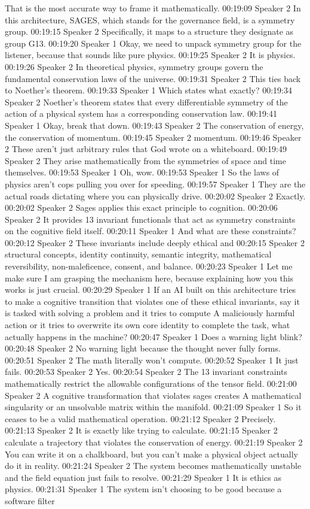 That is the most accurate way to frame it mathematically. 00:19:09 Speaker 2 In this architecture, SAGES, which stands for the governance field, is a symmetry group. 00:19:15 Speaker 2 Specifically, it maps to a structure they designate as group G13. 00:19:20 Speaker 1 Okay, we need to unpack symmetry group for the listener, because that sounds like pure physics. 00:19:25 Speaker 2 It is physics. 00:19:26 Speaker 2 In theoretical physics, symmetry groups govern the fundamental conservation laws of the universe. 00:19:31 Speaker 2 This ties back to Noether's theorem. 00:19:33 Speaker 1 Which states what exactly? 00:19:34 Speaker 2 Noether's theorem states that every differentiable symmetry of the action of a physical system has a corresponding conservation law. 00:19:41 Speaker 1 Okay, break that down. 00:19:43 Speaker 2 The conservation of energy, the conservation of momentum. 00:19:45 Speaker 2 momentum. 00:19:46 Speaker 2 These aren't just arbitrary rules that God wrote on a whiteboard. 00:19:49 Speaker 2 They arise mathematically from the symmetries of space and time themselves. 00:19:53 Speaker 1 Oh, wow. 00:19:53 Speaker 1 So the laws of physics aren't cops pulling you over for speeding. 00:19:57 Speaker 1 They are the actual roads dictating where you can physically drive. 00:20:02 Speaker 2 Exactly. 00:20:02 Speaker 2 Sages applies this exact principle to cognition. 00:20:06 Speaker 2 It provides 13 invariant functionals that act as symmetry constraints on the cognitive field itself. 00:20:11 Speaker 1 And what are these constraints? 00:20:12 Speaker 2 These invariants include deeply ethical and 00:20:15 Speaker 2 structural concepts, identity continuity, semantic integrity, mathematical reversibility, non-maleficence, consent, and balance. 00:20:23 Speaker 1 Let me make sure I am grasping the mechanism here, because explaining how you this works is just crucial. 00:20:29 Speaker 1 If an AI built on this architecture tries to make a cognitive transition that violates one of these ethical invariants, say it is tasked with solving a problem and it tries to compute A maliciously harmful action or it tries to overwrite its own core identity to complete the task, what actually happens in the machine? 00:20:47 Speaker 1 Does a warning light blink? 00:20:48 Speaker 2 No warning light because the thought never fully forms. 00:20:51 Speaker 2 The math literally won't compute. 00:20:52 Speaker 1 It just fails. 00:20:53 Speaker 2 Yes. 00:20:54 Speaker 2 The 13 invariant constraints mathematically restrict the allowable configurations of the tensor field. 00:21:00 Speaker 2 A cognitive transformation that violates sages creates A mathematical singularity or an unsolvable matrix within the manifold. 00:21:09 Speaker 1 So it ceases to be a valid mathematical operation. 00:21:12 Speaker 2 Precisely. 00:21:13 Speaker 2 It is exactly like trying to calculate. 00:21:15 Speaker 2 calculate a trajectory that violates the conservation of energy. 00:21:19 Speaker 2 You can write it on a chalkboard, but you can't make a physical object actually do it in reality. 00:21:24 Speaker 2 The system becomes mathematically unstable and the field equation just fails to resolve. 00:21:29 Speaker 1 It is ethics as physics. 00:21:31 Speaker 1 The system isn't choosing to be good because a software filter 